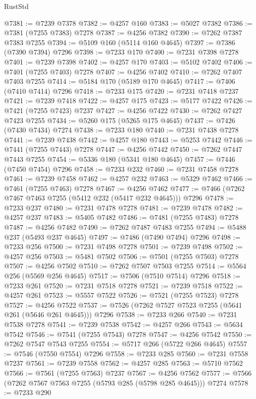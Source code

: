 \begin{lexlean}{RustStd}
\begin{coremodule}
@7381 := @7239 @7378
@7382 := @4257 @160
@7383 := @5027 @7382
@7386 := @7381 (@7255 @7383) @7278
@7387 := @4256 @7382
@7390 := @7262 @7387 @7383 @7255
@7394 := @5109 @160 (@5114 @160 @4645)
@7397 := @7386 (@7390 @7394) @7296
@7398 := @7233 @170
@7400 := @7231 @7398 @7278
@7401 := @7239 @7398
@7402 := @4257 @170
@7403 := @5102 @7402
@7406 := @7401 (@7255 @7403) @7278
@7407 := @4256 @7402
@7410 := @7262 @7407 @7403 @7255
@7414 := @5184 @170 (@5189 @170 @4645)
@7417 := @7406 (@7410 @7414) @7296
@7418 := @7233 @175
@7420 := @7231 @7418 @7237
@7421 := @7239 @7418
@7422 := @4257 @175
@7423 := @5177 @7422
@7426 := @7421 (@7255 @7423) @7237
@7427 := @4256 @7422
@7430 := @7262 @7427 @7423 @7255
@7434 := @5260 @175 (@5265 @175 @4645)
@7437 := @7426 (@7430 @7434) @7274
@7438 := @7233 @180
@7440 := @7231 @7438 @7278
@7441 := @7239 @7438
@7442 := @4257 @180
@7443 := @5253 @7442
@7446 := @7441 (@7255 @7443) @7278
@7447 := @4256 @7442
@7450 := @7262 @7447 @7443 @7255
@7454 := @5336 @180 (@5341 @180 @4645)
@7457 := @7446 (@7450 @7454) @7296
@7458 := @7233 @232
@7460 := @7231 @7458 @7278
@7461 := @7239 @7458
@7462 := @4257 @232
@7463 := @5329 @7462
@7466 := @7461 (@7255 @7463) @7278
@7467 := @4256 @7462
@7477 := @7466 (@7262 @7467 @7463 @7255 (@5412 @232 (@5417 @232 @4645))) @7296
@7478 := @7233 @237
@7480 := @7231 @7478 @7278
@7481 := @7239 @7478
@7482 := @4257 @237
@7483 := @5405 @7482
@7486 := @7481 (@7255 @7483) @7278
@7487 := @4256 @7482
@7490 := @7262 @7487 @7483 @7255
@7494 := @5488 @237 (@5493 @237 @4645)
@7497 := @7486 (@7490 @7494) @7296
@7498 := @7233 @256
@7500 := @7231 @7498 @7278
@7501 := @7239 @7498
@7502 := @4257 @256
@7503 := @5481 @7502
@7506 := @7501 (@7255 @7503) @7278
@7507 := @4256 @7502
@7510 := @7262 @7507 @7503 @7255
@7514 := @5564 @256 (@5569 @256 @4645)
@7517 := @7506 (@7510 @7514) @7296
@7518 := @7233 @261
@7520 := @7231 @7518 @7278
@7521 := @7239 @7518
@7522 := @4257 @261
@7523 := @5557 @7522
@7526 := @7521 (@7255 @7523) @7278
@7527 := @4256 @7522
@7537 := @7526 (@7262 @7527 @7523 @7255 (@5641 @261 (@5646 @261 @4645))) @7296
@7538 := @7233 @266
@7540 := @7231 @7538 @7278
@7541 := @7239 @7538
@7542 := @4257 @266
@7543 := @5634 @7542
@7546 := @7541 (@7255 @7543) @7278
@7547 := @4256 @7542
@7550 := @7262 @7547 @7543 @7255
@7554 := @5717 @266 (@5722 @266 @4645)
@7557 := @7546 (@7550 @7554) @7296
@7558 := @7233 @285
@7560 := @7231 @7558 @7237
@7561 := @7239 @7558
@7562 := @4257 @285
@7563 := @5710 @7562
@7566 := @7561 (@7255 @7563) @7237
@7567 := @4256 @7562
@7577 := @7566 (@7262 @7567 @7563 @7255 (@5793 @285 (@5798 @285 @4645))) @7274
@7578 := @7233 @290

\end{coremodule}
\end{lexlean}
